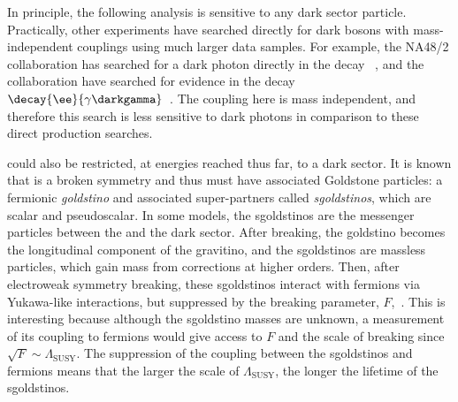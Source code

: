 
In principle, the following analysis is sensitive to any dark sector particle.
Practically, other experiments have searched directly for dark bosons with mass-independent
couplings using much larger data samples.
For example, the NA48/2 collaboration has searched for a dark photon directly in the decay
\decay{\piz}{\gamma\darkgamma}~\cite{CERNNA48/2:2015lha}, and the \babar collaboration have
searched for evidence in the decay $\decay{\ee}{\gamma\darkgamma}$~\cite{Lees:2014xha}.
The coupling here is mass independent, and therefore this search is less sensitive to dark photons
in comparison to these direct production searches.


\SUSY could also be restricted, at energies reached thus far, to a dark sector.
It is known that \SUSY is a broken symmetry and thus must have associated Goldstone particles:
a fermionic \emph{goldstino} and associated super-partners called \emph{sgoldstinos}, which are
scalar and pseudoscalar.
In some models, the sgoldstinos are the messenger particles between the \sm and the dark \SUSY
sector.
After \SUSY breaking, the goldstino becomes the longitudinal component of the gravitino, and the
sgoldstinos are massless particles, which gain mass from corrections at higher orders.
Then, after electroweak symmetry breaking, these sgoldstinos interact with \sm fermions via
Yukawa-like interactions, but suppressed by the \SUSY breaking parameter,
$F$,~\cite{Alekhin:2015byh}.
This is interesting because although the sgoldstino masses are unknown, a measurement of its
coupling to fermions would give access to $F$ and the scale of \SUSY breaking since
$\sqrt{F}\sim\Lambda_\mathrm{SUSY}$.
The suppression of the coupling between the sgoldstinos and fermions means that the larger the
scale of $\Lambda_\mathrm{SUSY}$, the longer the lifetime of the sgoldstinos.


